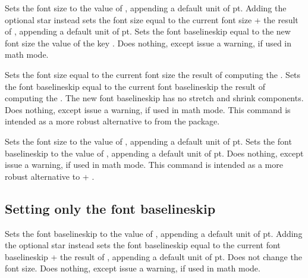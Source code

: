 \documentclass{beery}
\begin{document}
Sets the font size to the value of , appending a default unit of \unit{pt}.
Adding the optional star \sarg{} instead sets the font size equal to the current font size + the result of , appending a default unit of \unit{pt}.
Sets the font baselineskip equal to the new font size \texttimes{} the value of the key .
Does nothing, except issue a warning, if used in math mode.

\begin{mydisplaycode}
   
\end{mydisplaycode}

Sets the font size equal to the current font size \texttimes{} the result of computing the .
Sets the font baselineskip equal to the current font baselineskip \texttimes{} the result of computing the .
The new font baselineskip has no stretch and shrink components.
Does nothing, except issue a warning, if used in math mode.
This command is intended as a more robust alternative to  from the  package.

\begin{mydisplaycode}
    
\end{mydisplaycode}

Sets the font size to the value of , appending a default unit of \unit{pt}.
Sets the font baselineskip to the value of , appending a default unit of \unit{pt}.
Does nothing, except issue a warning, if used in math mode.
This command is intended as a more robust alternative to  + .

\subsection{Setting only the font baselineskip}
\label{subsec:setfontbaselineskip}

\begin{mydisplaycode}
   \sarg{} 
\end{mydisplaycode}

Sets the font baselineskip to the value of , appending a default unit of \unit{pt}.
Adding the optional star \sarg{} instead sets the font baselineskip equal to the current font baselineskip + the result of , appending a default unit of \unit{pt}.
Does not change the font size.
Does nothing, except issue a warning, if used in math mode.
\end{document}
